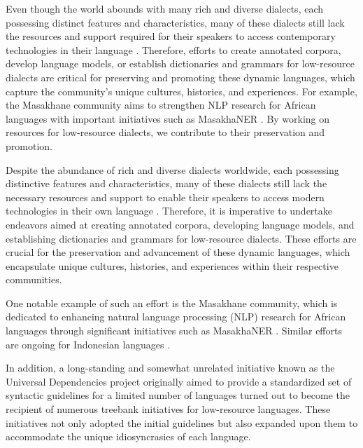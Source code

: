 \iffalse Even though the world abounds with many rich and diverse
dialects, each possessing distinct features and characteristics, many
of these dialects still lack the resources and support required for
their speakers to access contemporary technologies in their language
\cite{joshi-etal-2020-state}.  Therefore, efforts to create annotated
corpora, develop language models, or establish dictionaries and
grammars for low-resource dialects are critical for preserving and
promoting these dynamic languages, which capture the community's
unique cultures, histories, and experiences. For example, the
Masakhane community aims to strengthen NLP research for African
languages with important initiatives such as MasakhaNER
\cite{adelani-etal-2021-masakhaner}. By working on resources for
low-resource dialects, we contribute to their preservation and
promotion.  
\else 

Despite the abundance of rich and diverse dialects
worldwide, each possessing distinctive features and characteristics,
many of these dialects still lack the necessary resources and support
to enable their speakers to access modern technologies in their own
language \cite{joshi-etal-2020-state}. Therefore, it is imperative
to undertake endeavors aimed at creating annotated corpora, developing
language models, and establishing dictionaries and grammars for
low-resource dialects. These efforts are crucial for the preservation
and advancement of these dynamic languages, which encapsulate unique
cultures, histories, and experiences within their respective
communities. 

One notable example of such an effort is the Masakhane community, which is
dedicated to enhancing natural language processing (NLP) research for
African languages through significant initiatives such as MasakhaNER
\cite{adelani-etal-2021-masakhaner}. Similar efforts are ongoing for
Indonesian languages \cite{cahyawijaya2022nusacrowd}.




\iffalse 

Another long standing, orthogonal in a way, established initiative
that initially aimed at offering a common set of syntactic guidelines
for a small set of languages, the Universal Dependencies project
\cite{nivre-etal-2020-universal}, turned out to be the recipient of
many low-resources languages treebank initiatives that followed and
often extended these initial guidelines to cope with their respective
idiosyncrasies.

\else 
In addition, a long-standing and somewhat unrelated initiative
known as the Universal Dependencies project
\cite{nivre-etal-2020-universal} originally aimed to provide a
standardized set of syntactic guidelines for a limited number of
languages turned out to become the recipient of numerous
treebank initiatives for low-resource languages. These initiatives not
only adopted the initial guidelines but also expanded upon them to
accommodate the unique idiosyncrasies of each language.  \fi

